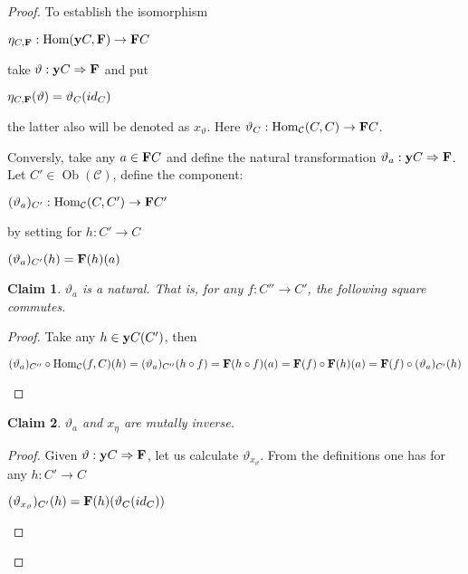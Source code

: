 \documentclass[a4paper]{article}
\theoremstyle{defin}
\theoremstyle{theorem}
\theoremstyle{claim}
\newtheorem{claim}{Claim}
\theoremstyle{prop}
\theoremstyle{lemma}
\theoremstyle{fact}
\theoremstyle{ex}
\theoremstyle{col}
\begin{document}
\begin{proof}

To establish the isomorphism
\begin{center}
$\eta_{C, {\bf F}} : \operatorname{Hom}({\bf y}C, {\bf F}) \to {\bf F} C$
\end{center}
take $\vartheta : {\bf y}C \Rightarrow {\bf F}$ and put
\begin{center}
$\eta_{C, {\bf F}}(\vartheta) = \vartheta_{C}(id_C)$
\end{center}
the latter also will be denoted as $x_{\vartheta}$. Here $\vartheta_{C} : \operatorname{Hom}_{\mathcal{C}}(C,C) \to {\bf F}C$.

Conversly, take any $a \in {\bf F}C$ and define the natural transformation $\vartheta_a : {\bf y} C \Rightarrow {\bf F}$. Let $C' \in \operatorname{Ob}(\mathcal{C})$, define the component:
\begin{center}
$(\vartheta_a)_{C'} : \operatorname{Hom}_{\mathcal{C}}(C,C') \to {\bf F}C'$
\end{center}
by setting for $h : C' \to C$
\begin{center}
$(\vartheta_a)_{C'}(h) = {\bf F}(h)(a)$
\end{center}

\begin{claim}
$\vartheta_a$ is a natural. That is, for any $f : C'' \to C'$, the following square commutes.

\centerline{
}
\end{claim}
\begin{proof}
Take any $h \in {\bf y}C(C')$, then
\begin{center}
$(\vartheta_a)_{C''} \circ \operatorname{Hom}_{\mathcal{C}}(f, C)(h) = (\vartheta_a)_{C''}(h \circ f) = {\bf F}(h \circ f)(a) = {\bf F}(f) \circ {\bf F}(h)(a) = {\bf F}(f) \circ (\vartheta_a)_{C'} (h)$
\end{center}
\end{proof}

\begin{claim}
$\vartheta_a$ and $x_{\eta}$ are mutally inverse.
\end{claim}
\begin{proof}
Given $\vartheta : {\bf y}C \Rightarrow {\bf F}$, let us calculate $\vartheta_{x_{\vartheta}}$. From the definitions one has for any $h : C' \to C$
\begin{center}
$(\vartheta_{x_{\vartheta}})_{C'}(h) = {\bf F}(h)(\vartheta_C(id_C))$
\end{center}


\end{proof}
\end{proof}
\end{document}
